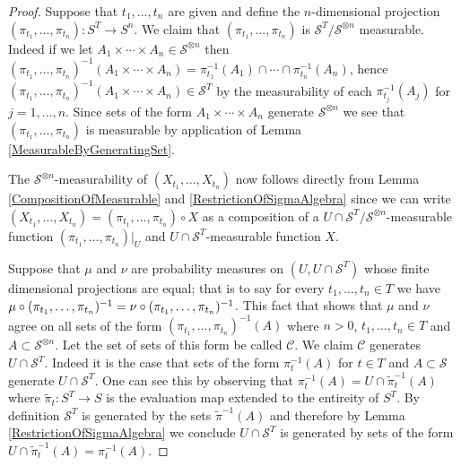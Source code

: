 \begin{proof}
Suppose that $t_1, \dotsc, t_n$ are given and define the $n$-dimensional projection
$(\pi_{t_1}, \dotsc, \pi_{t_n}) : S^T \to S^n$.   We claim that 
$(\pi_{t_1}, \dotsc, \pi_{t_n})$ is 
$\mathcal{S}^T/\mathcal{S}^{\otimes n}$ measurable.  Indeed if we let $A_1 \times \dotsb \times A_n \in
\mathcal{S}^{\otimes n}$ then $(\pi_{t_1}, \dotsc, \pi_{t_n})^{-1}(A_1
\times \dotsb \times A_n) = 
\pi_{t_1}^{-1}(A_1) \cap \dotsb \cap \pi_{t_n}^{-1}(A_n) $, hence $(\pi_{t_1}, \dotsc, \pi_{t_n})^{-1}(A_1
\times \dotsb \times A_n) \in
\mathcal{S}^T$ by the measurability of each $\pi_{t_j}^{-1}(A_j)$ for
$j=1, \dotsc, n$.  Since sets of the form $A_1 \times \dotsb \times
A_n$ generate $\mathcal{S}^{\otimes n}$ 
we see that $(\pi_{t_1}, \dotsc, \pi_{t_n})$ is measurable by
application of Lemma \ref{MeasurableByGeneratingSet}.

The $\mathcal{S}^{\otimes n}$-measurability of $(X_{t_1}, \dotsc,
X_{t_n})$ now follows directly from Lemma
\ref{CompositionOfMeasurable} and \ref{RestrictionOfSigmaAlgebra} since we can write $(X_{t_1}, \dotsc,
X_{t_n}) = (\pi_{t_1}, \dotsc, \pi_{t_n}) \circ X$ as a composition of
a $U \cap \mathcal{S}^T/\mathcal{S}^{\otimes n}$-measurable function
$(\pi_{t_1}, \dotsc, \pi_{t_n})\vert_U$ and $U \cap \mathcal{S}^T$-measurable function $X$.

Suppose that $\mu$ and $\nu$ are probability measures on $(U, U \cap
\mathcal{S}^T)$ whose finite dimensional projections are equal; that
is to say for every $t_1, \dotsc, t_n \in T$ we have 
$\mu \circ (\pi_{t_1},\dotsc, \pi_{t_n})^{-1} =
\nu \circ (\pi_{t_1},\dotsc, \pi_{t_n})^{-1}$.  This fact that
shows that $\mu$ and $\nu$ agree on all sets of the form
$(\pi_{t_1},\dotsc, \pi_{t_n})^{-1}(A)$ where $n > 0$, $t_1, \dotsc,
t_n \in T$ and $A \subset \mathcal{S}^{\otimes n}$.  Let the
set of sets of this form be called $\mathcal{C}$.  We claim
$\mathcal{C}$ generates $U \cap \mathcal{S}^T$.  Indeed it is the case
that sets of the form $\pi_t^{-1}(A)$ for $t \in T$ and $A \subset
\mathcal{S}$ generate $U \cap \mathcal{S}^T$.  One can see this by
observing that $\pi_t^{-1}(A) = U \cap \tilde{\pi}_t^{-1}(A)$ where
$\tilde{\pi}_t : S^T \to S$ is the evaluation map extended to the entireity of $S^T$.  By
definition $\mathcal{S}^T$ is generated by the sets
$\tilde{\pi}^{-1}(A)$ and therefore by Lemma
\ref{RestrictionOfSigmaAlgebra} we conclude $U \cap \mathcal{S}^T$ is
generated by sets of the form $U \cap \tilde{\pi}_t^{-1}(A) =
\pi_t^{-1}(A)$.


\end{proof}
